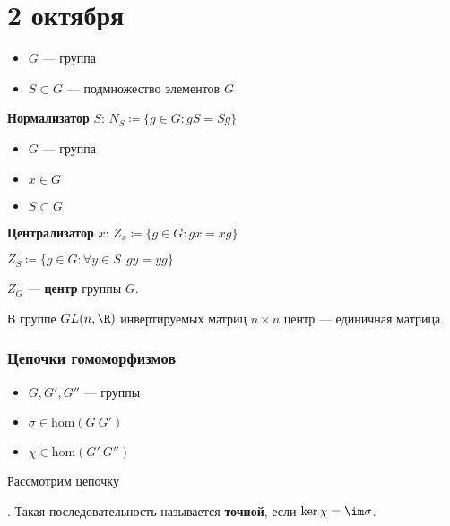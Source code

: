 \chapter{2 октября}

\begin{definition}\itemfix
    \begin{itemize}
        \item \(G\) --- группа
        \item \(S \subset G\) --- подмножество элементов \(G\)
    \end{itemize}

    \textbf{Нормализатор} \(S\): \(N_S \coloneqq \{g \in G : gS = Sg\}\)
\end{definition}

\begin{definition}\itemfix
    \begin{itemize}
        \item \(G\) --- группа
        \item \(x \in G\)
        \item \(S \subset G\)
    \end{itemize}

    \textbf{Централизатор} \(x\): \(Z_x \coloneqq \{g \in G : gx = xg\}\)

    \(Z_S \coloneqq \{g \in G : \forall y \in S \ \ gy = yg\}\)

    \(Z_G\) --- \textbf{центр} группы \(G\).
\end{definition}

\begin{example}
    В группе \(GL(n, \R)\) инвертируемых матриц \(n \times n\) центр --- единичная матрица.
\end{example}

\subsection{Цепочки гомоморфизмов}

\begin{definition}\itemfix
    \begin{itemize}
        \item \(G, G', G''\) --- группы
        \item \(\sigma \in \mathrm{hom}(G\ G')\)
        \item \(\chi \in \mathrm{hom}(G'\ G'')\)
    \end{itemize}
    Рассмотрим цепочку . Такая последовательность называется \textbf{точной}, если \(\ker \chi = \im \sigma\).
\end{definition}

